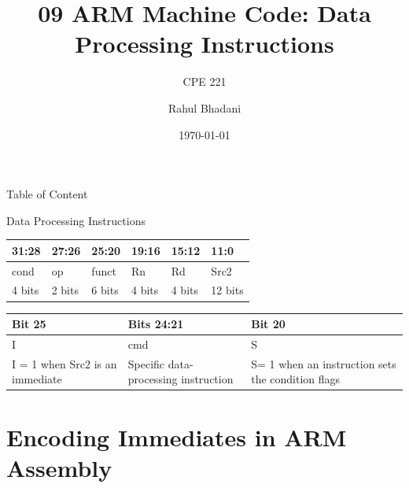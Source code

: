 \documentclass[aspectratio=169]{beamer}
\title{09 ARM Machine Code: Data Processing Instructions}
\subtitle{CPE 221}
\author{Rahul Bhadani}
\institute{The University of Alabama in Huntsville}
\date{\today}
\begin{document}
\begin{frame}

    \titlepage

\end{frame}

\begin{frame}{Table of Content}
    \tableofcontents
\end{frame}


\begin{frame}{Data Processing Instructions}
\begin{center}
    \begin{tabular}{|p{4em}|p{4em}|p{4em}|p{4em}|p{4em}|p{4em}|}
    \hline
    31:28 & 27:26 & 25:20 & 19:16 & 15:12 & 11:0 \\
    \hline
    cond & op & funct & Rn & Rd & Src2 \\
    \hline
    4 bits & 2 bits & 6 bits & 4 bits & 4 bits & 12 bits \\
    \hline
    \end{tabular}

    \vspace{0.5cm}

    \begin{tabular}{|p{11em}|p{11em}|p{11em}|}
        \hline
        Bit 25 & Bits 24:21 & Bit 20\\
        \hline
        I & cmd & S \\
        \hline
        I = 1 when Src2 is an immediate & Specific data-processing instruction & S= 1 when an instruction sets the condition flags\\
        \hline
    \end{tabular}
\end{center}

\end{frame}

\section{Encoding Immediates in ARM Assembly}

\begin{frame}
    \sectionpage
\end{frame}
\end{document}
